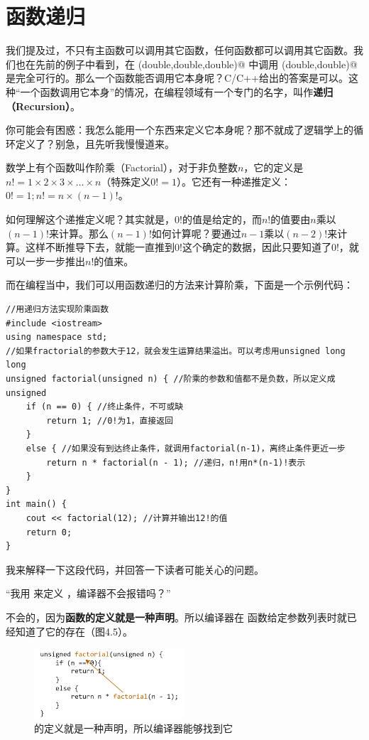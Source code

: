 \section{函数递归}
我们提及过，不只有主函数可以调用其它函数，任何函数都可以调用其它函数。我们也在先前的例子中看到，在 \lstinline@max(double,double,double)@ 中调用 \lstinline@max(double,double)@ 是完全可行的。那么一个函数能否调用它本身呢？C/C++给出的答案是可以。这种``一个函数调用它本身''的情况，在编程领域有一个专门的名字，叫作\textbf{递归（Recursion）}。\par
你可能会有困惑：我怎么能用一个东西来定义它本身呢？那不就成了逻辑学上的循环定义了？别急，且先听我慢慢道来。\par
数学上有个函数叫作阶乘（Factorial），对于非负整数$n$，它的定义是$n!=1\times2\times3\times\ldots\times n$（特殊定义$0!=1$）。它还有一种递推定义：$0!=1; n!=n\times(n-1)!$。\par
如何理解这个递推定义呢？其实就是，$0!$的值是给定的，而$n!$的值要由$n$乘以$(n-1)!$来计算。那么$(n-1)!$如何计算呢？要通过$n-1$乘以$(n-2)!$来计算。这样不断推导下去，就能一直推到$0!$这个确定的数据，因此只要知道了$0!$，就可以一步一步推出$n!$的值来。\par
而在编程当中，我们可以用函数递归的方法来计算阶乘，下面是一个示例代码：
\begin{lstlisting}[caption=\texttt{Factorial\_with\_Recursion.cpp},label=lst:FactorialWithRecursion]
//用递归方法实现阶乘函数
#include <iostream>
using namespace std;
//如果fractorial的参数大于12，就会发生运算结果溢出。可以考虑用unsigned long long
unsigned factorial(unsigned n) { //阶乘的参数和值都不是负数，所以定义成unsigned
    if (n == 0) { //终止条件，不可或缺
        return 1; //0!为1，直接返回
    }
    else { //如果没有到达终止条件，就调用factorial(n-1)，离终止条件更近一步
        return n * factorial(n - 1); //递归，n!用n*(n-1)!表示
    }
}
int main() {
    cout << factorial(12); //计算并输出12!的值
    return 0;
}
\end{lstlisting}
我来解释一下这段代码，并回答一下读者可能关心的问题。\par
{\kaishu ``我用 \lstinline@factorial@ 来定义 \lstinline@factorial@，编译器不会报错吗？''}\par
不会的，因为\textbf{函数的定义就是一种声明}。所以编译器在 \lstinline@factorial@ 函数给定参数列表时就已经知道了它的存在（图4.5）。\par
\begin{figure}[htbp]
    \centering
    \includegraphics[width=0.5\textwidth]{../images/generalized_parts/04_factorial_code_logic_300.png}
    \caption{\lstinline@factorial@ 的定义就是一种声明，所以编译器能够找到它}
\end{figure}
